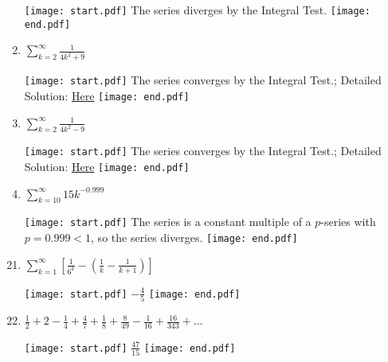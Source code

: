 \documentclass[12pt]{article}
\begin{document}
\begin{enumerate}
\texttt{[image: start.pdf]}
{{The series diverges by the Integral Test.}}
\texttt{[image: end.pdf]}


\item $\sum_{k=2}^{\infty}{\frac{1}{4k^2+9}}$

\texttt{[image: start.pdf]}
{{The series converges by the Integral Test.; Detailed Solution: \textcolor{blue}{\href{http://www.math.drexel.edu/classes/Calculus/resources/Math123HW/Solutions/123_08_Convergence_Tests_18.pdf}{Here}}}}
\texttt{[image: end.pdf]}


\item $\sum_{k=2}^{\infty}{\frac{1}{4k^2-9}}$

\texttt{[image: start.pdf]}
{{The series converges by the Integral Test.; Detailed Solution: \textcolor{blue}{\href{http://www.math.drexel.edu/classes/Calculus/resources/Math123HW/Solutions/123_08_Convergence_Tests_19.pdf}{Here}}}}
\texttt{[image: end.pdf]}


\item $\sum_{k=10}^{\infty}{15k^{-0.999}}$

\texttt{[image: start.pdf]}
{{The series is a constant multiple of a $p$-series with $p=0.999<1$, so the series diverges.}}
\texttt{[image: end.pdf]}


\end{enumerate}


\begin{enumerate}
\setcounter{enumi}{20}

\item $\sum_{k=1}^{\infty}{\left[\frac{1}{6^k}-\left(\frac{1}{k}-\frac{1}{k+1}\right)\right]   }$

\texttt{[image: start.pdf]}
{{$-\frac{4}{5}$ }}
\texttt{[image: end.pdf]}


\item $\frac{1}{2}+2-\frac{1}{4}+\frac{4}{7}+\frac{1}{8}+\frac{8}{49}-\frac{1}{16}+\frac{16}{343}+\ldots$  \newline  {}

\texttt{[image: start.pdf]}
{{$\frac{47}{15}$ }}
\texttt{[image: end.pdf]}


\end{enumerate}
\end{document}
